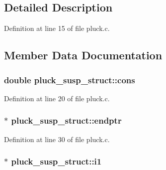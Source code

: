 \subsection{Detailed Description}


Definition at line 15 of file pluck.\+c.



\subsection{Member Data Documentation}
\subsubsection[{\texorpdfstring{cons}{cons}}]{\setlength{\rightskip}{0pt plus 5cm}double pluck\+\_\+susp\+\_\+struct\+::cons}\hypertarget{structpluck__susp__struct_aa8bc9f8b2bd88c556f47661fe5073a5d}{}\label{structpluck__susp__struct_aa8bc9f8b2bd88c556f47661fe5073a5d}


Definition at line 20 of file pluck.\+c.

\subsubsection[{\texorpdfstring{endptr}{endptr}}]{$\ast$ pluck\+\_\+susp\+\_\+struct\+::endptr}\hypertarget{structpluck__susp__struct_afcee2cca761957cf0aa2a86c52b9bcf6}{}\label{structpluck__susp__struct_afcee2cca761957cf0aa2a86c52b9bcf6}


Definition at line 30 of file pluck.\+c.

\subsubsection[{\texorpdfstring{i1}{i1}}]{$\ast$ pluck\+\_\+susp\+\_\+struct\+::i1}\hypertarget{structpluck__susp__struct_ac69bf68ba023bd9c52566e426945143c}{}\label{structpluck__susp__struct_ac69bf68ba023bd9c52566e426945143c}


